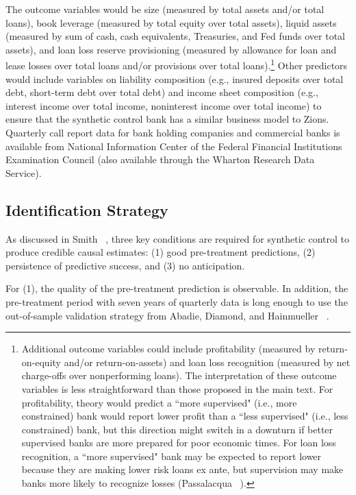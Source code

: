 \documentclass[12pt]{article}
\begin{document}
The outcome variables would be size (measured by total assets and/or total loans), book leverage (measured by total equity over total assets), liquid assets (measured by sum of cash, cash equivalents, Treasuries, and Fed funds over total assets), and loan loss reserve provisioning (measured by allowance for loan and lease losses over total loans and/or provisions over total loans).\footnote{Additional outcome variables could include profitability (measured by return-on-equity and/or return-on-assets) and loan loss recognition (measured by net charge-offs over nonperforming loans). The interpretation of these outcome variables is less straightforward than those proposed in the main text. For profitability, theory would predict a ``more supervised" (i.e., more constrained) bank would report lower profit than a ``less supervised" (i.e., less constrained) bank, but this direction might switch in a downturn if better supervised banks are more prepared for poor economic times.  For loan loss recognition, a ``more supervised" bank may be expected to report lower because they are making lower risk loans ex ante, but supervision may make banks more likely to recognize losses (Passalacqua ~\cite{passalacqua2020}).}  Other predictors would include variables on liability composition (e.g., insured deposits over total debt, short-term debt over total debt) and income sheet composition (e.g., interest income over total income, noninterest income over total income) to ensure that the synthetic control bank has a similar business model to Zions.  Quarterly call report data for bank holding companies and commercial banks is available from National Information Center of the Federal Financial Institutions Examination Council (also available through the Wharton Research Data Service).

\subsection{Identification Strategy}

As discussed in Smith ~\cite{smith2022}, three key conditions are required for synthetic control to produce credible causal estimates: (1) good pre-treatment predictions, (2) persistence of predictive success, and (3) no anticipation.  

For (1), the quality of the pre-treatment prediction is observable.  In addition, the pre-treatment period with seven years of quarterly data is long enough to use the out-of-sample validation strategy from Abadie, Diamond, and Hainmueller ~\cite{adh2010}. 
\end{document}
